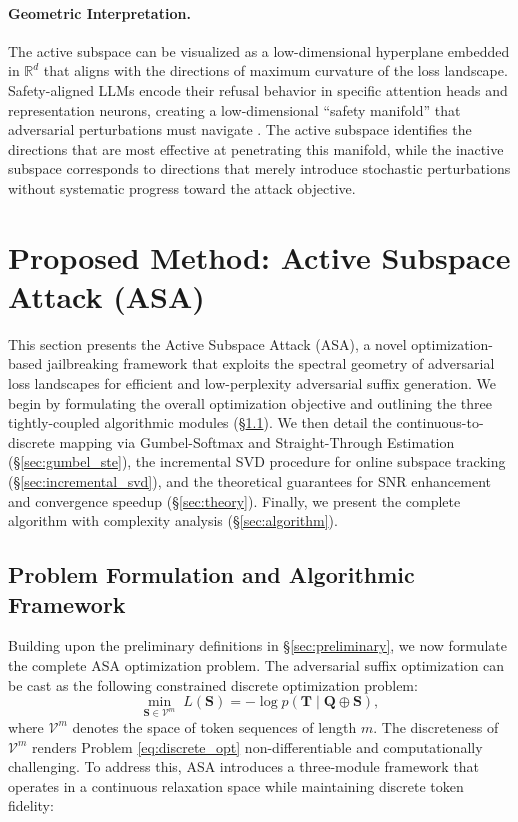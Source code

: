 \documentclass[preprint,12pt]{elsarticle}
\begin{document}
\paragraph{Geometric Interpretation.} The active subspace can be visualized as a low-dimensional hyperplane embedded in $\mathbb{R}^d$ that aligns with the directions of maximum curvature of the loss landscape. Safety-aligned LLMs encode their refusal behavior in specific attention heads and representation neurons, creating a low-dimensional ``safety manifold'' that adversarial perturbations must navigate \cite{zou2023universal}. The active subspace identifies the directions that are most effective at penetrating this manifold, while the inactive subspace corresponds to directions that merely introduce stochastic perturbations without systematic progress toward the attack objective.




\section{Proposed Method: Active Subspace Attack (ASA)}
\label{sec:method}

This section presents the Active Subspace Attack (ASA), a novel optimization-based jailbreaking framework that exploits the spectral geometry of adversarial loss landscapes for efficient and low-perplexity adversarial suffix generation. We begin by formulating the overall optimization objective and outlining the three tightly-coupled algorithmic modules (\S\ref{sec:framework}). We then detail the continuous-to-discrete mapping via Gumbel-Softmax and Straight-Through Estimation (\S\ref{sec:gumbel_ste}), the incremental SVD procedure for online subspace tracking (\S\ref{sec:incremental_svd}), and the theoretical guarantees for SNR enhancement and convergence speedup (\S\ref{sec:theory}). Finally, we present the complete algorithm with complexity analysis (\S\ref{sec:algorithm}).

\subsection{Problem Formulation and Algorithmic Framework}
\label{sec:framework}

Building upon the preliminary definitions in \S\ref{sec:preliminary}, we now formulate the complete ASA optimization problem. The adversarial suffix optimization can be cast as the following constrained discrete optimization problem:
\begin{equation}
\label{eq:discrete_opt}
\min_{\mathbf{S} \in \mathcal{V}^m} \; L(\mathbf{S}) = -\log p(\mathbf{T} \mid \mathbf{Q} \oplus \mathbf{S}),
\end{equation}
where $\mathcal{V}^m$ denotes the space of token sequences of length $m$. The discreteness of $\mathcal{V}^m$ renders Problem \eqref{eq:discrete_opt} non-differentiable and computationally challenging. To address this, ASA introduces a three-module framework that operates in a continuous relaxation space while maintaining discrete token fidelity:
\end{document}
